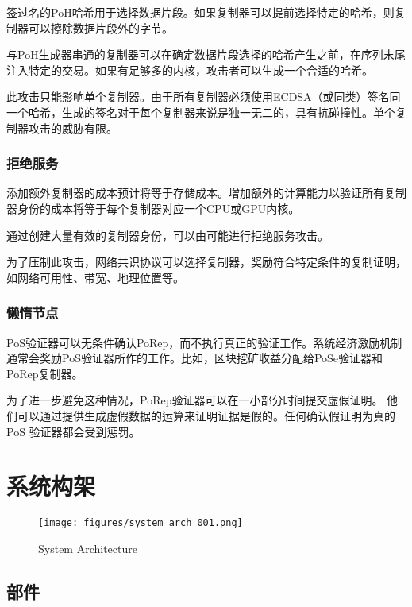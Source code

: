 \documentclass[12pt, uft8]{ctexart}
\begin{document}
签过名的PoH哈希用于选择数据片段。如果复制器可以提前选择特定的哈希，则复制器可以擦除数据片段外的字节。

与PoH生成器串通的复制器可以在确定数据片段选择的哈希产生之前，在序列末尾注入特定的交易。如果有足够多的内核，攻击者可以生成一个合适的哈希。

此攻击只能影响单个复制器。由于所有复制器必须使用ECDSA（或同类）签名同一个哈希，生成的签名对于每个复制器来说是独一无二的，具有抗碰撞性。单个复制器攻击的威胁有限。

\subsubsection{拒绝服务}
添加额外复制器的成本预计将等于存储成本。增加额外的计算能力以验证所有复制器身份的成本将等于每个复制器对应一个CPU或GPU内核。

通过创建大量有效的复制器身份，可以由可能进行拒绝服务攻击。

为了压制此攻击，网络共识协议可以选择复制器，奖励符合特定条件的复制证明，如网络可用性、带宽、地理位置等。

\subsubsection{懒惰节点}

PoS验证器可以无条件确认PoRep，而不执行真正的验证工作。系统经济激励机制通常会奖励PoS验证器所作的工作。比如，区块挖矿收益分配给PoSe验证器和PoRep复制器。

为了进一步避免这种情况，PoRep验证器可以在一小部分时间提交虚假证明。  他们可以通过提供生成虚假数据的运算来证明证据是假的。任何确认假证明为真的PoS 验证器都会受到惩罚。

\section{系统构架}\label{system_architecture}

\begin{figure}
  \begin{center}
    \centering
    \texttt{[image: figures/system\_arch\_001.png]}
    \caption[Fig 9]{System Architecture \label{fig_9}}
  \end{center}
  \end{figure}

\subsection{部件}
\end{document}
